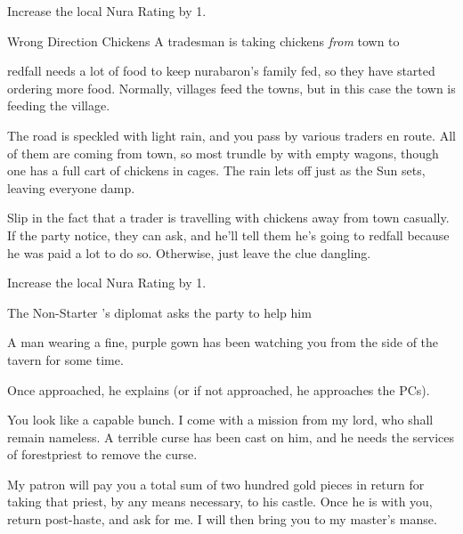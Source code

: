 \begin{multicols}{2}
Increase the local Nura Rating by 1.

{\N Wrong Direction Chickens}%
{A tradesman is taking chickens \emph{from} town to }%

\Gls{redfall} needs a lot of food to keep \gls{nurabaron}'s family fed, so they have started ordering more food.
Normally, villages feed the towns, but in this case the town is feeding the village.

\begin{boxtext}

	The road is speckled with light rain, and you pass by various traders en route.
	All of them are coming from town, so most trundle by with empty wagons, though one has a full cart of chickens in cages.
	The rain lets off just as the Sun sets, leaving everyone damp.

\end{boxtext}

Slip in the fact that a trader is travelling with chickens away from \gls{town} casually.
If the party notice, they can ask, and he'll tell them he's going to \gls{redfall} because he was paid a lot to do so.
Otherwise, just leave the clue dangling.

Increase the local Nura Rating by 1.

\resumecontents[Town]

{The Non-Starter}%
{'s diplomat asks the party to help him}%
\label{nonstarter}

\stopcontents[Town]

\begin{boxtext}

	A man wearing a fine, purple gown has been watching you from the side of the tavern for some time.

\end{boxtext}

Once approached, he explains (or if not approached, he approaches the PCs).

\begin{speechtext}

	You look like a capable bunch.
	I come with a mission from my lord, who shall remain nameless.
	A terrible curse has been cast on him, and he needs the services of \gls{forestpriest} to remove the curse.

	My patron will pay you a total sum of two hundred gold pieces in return for taking that priest, by any means necessary, to his castle.
	Once he is with you, return post-haste, and ask for me.
	I will then bring you to my master's manse.


\end{speechtext}
\end{multicols}
